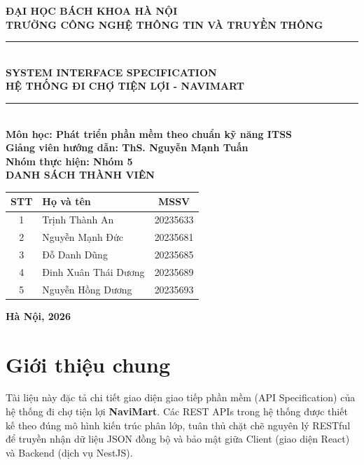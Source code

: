 \documentclass[12pt,a4paper]{article}
\begin{document}
\begin{titlepage}
    \begin{center}
        \textbf{\Large ĐẠI HỌC BÁCH KHOA HÀ NỘI} \\
        \textbf{\Large TRƯỜNG CÔNG NGHỆ THÔNG TIN VÀ TRUYỀN THÔNG} \\
        \vskip 3cm
        \noindent\rule{\textwidth}{2pt} \\
        \vskip 0.6cm
        \textbf{\Huge SYSTEM INTERFACE SPECIFICATION} \\[0.5em]
        \textbf{\huge HỆ THỐNG ĐI CHỢ TIỆN LỢI - NAVIMART} \\
        \noindent\rule{\textwidth}{2pt} \\
        \vskip 1.5cm
        \textbf{\large Môn học: Phát triển phần mềm theo chuẩn kỹ năng ITSS} \\
        \textbf{\large Giảng viên hướng dẫn: ThS. Nguyễn Mạnh Tuấn} \\
        \textbf{\large Nhóm thực hiện: Nhóm 5} \\
        \vskip 1.5cm
        \textbf{\large DANH SÁCH THÀNH VIÊN} \\
        \vskip 0.4cm
        \begin{tabular}{|c|l|c|}
            \hline
            \textbf{STT} & \textbf{Họ và tên} & \textbf{MSSV} \\
            \hline
            1 & Trịnh Thành An & 20235633 \\
            \hline
            2 & Nguyễn Mạnh Đức & 20235681 \\
            \hline
            3 & Đỗ Danh Dũng & 20235685 \\
            \hline
            4 & Đinh Xuân Thái Dương & 20235689 \\
            \hline
            5 & Nguyễn Hồng Dương & 20235693 \\
            \hline
        \end{tabular}
        \vfill
        \textbf{Hà Nội, 2026}
    \end{center}
\end{titlepage}

\tableofcontents
\newpage

\section{Giới thiệu chung}
Tài liệu này đặc tả chi tiết giao diện giao tiếp phần mềm (API Specification) của hệ thống đi chợ tiện lợi \textbf{NaviMart}. Các REST APIs trong hệ thống được thiết kế theo đúng mô hình kiến trúc phân lớp, tuân thủ chặt chẽ nguyên lý RESTful để truyền nhận dữ liệu JSON đồng bộ và bảo mật giữa Client (giao diện React) và Backend (dịch vụ NestJS).
\end{document}
